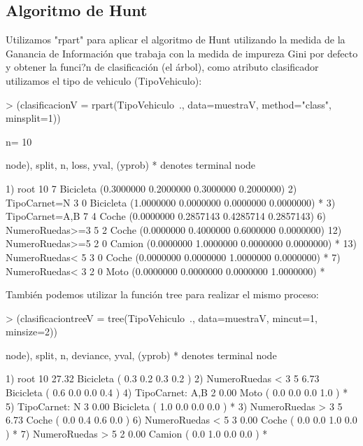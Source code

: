 \documentclass[a4paper]{article}
\begin{document}
\subsection{Algoritmo de Hunt}
Utilizamos "rpart" para aplicar el algoritmo de Hunt utilizando la medida de la Ganancia de Información que trabaja con la medida
de impureza Gini por defecto y obtener la funci?n de clasificación (el árbol), como atributo clasificador utilizamos el tipo de vehiculo (TipoVehiculo):
\begin{Schunk}
\begin{Sinput}
> (clasificacionV = rpart(TipoVehiculo~., data=muestraV, method="class", minsplit=1))
\end{Sinput}
\begin{Soutput}
n= 10 

node), split, n, loss, yval, (yprob)
      * denotes terminal node

 1) root 10 7 Bicicleta (0.3000000 0.2000000 0.3000000 0.2000000)  
   2) TipoCarnet=N 3 0 Bicicleta (1.0000000 0.0000000 0.0000000 0.0000000) *
   3) TipoCarnet=A,B 7 4 Coche (0.0000000 0.2857143 0.4285714 0.2857143)  
     6) NumeroRuedas>=3 5 2 Coche (0.0000000 0.4000000 0.6000000 0.0000000)  
      12) NumeroRuedas>=5 2 0 Camion (0.0000000 1.0000000 0.0000000 0.0000000) *
      13) NumeroRuedas< 5 3 0 Coche (0.0000000 0.0000000 1.0000000 0.0000000) *
     7) NumeroRuedas< 3 2 0 Moto (0.0000000 0.0000000 0.0000000 1.0000000) *
\end{Soutput}
\end{Schunk}

También podemos utilizar la función tree para realizar el mismo proceso:
\begin{Schunk}
\begin{Sinput}
> (clasificaciontreeV = tree(TipoVehiculo~., data=muestraV, mincut=1, minsize=2))
\end{Sinput}
\begin{Soutput}
node), split, n, deviance, yval, (yprob)
      * denotes terminal node

1) root 10 27.32 Bicicleta ( 0.3 0.2 0.3 0.2 )  
  2) NumeroRuedas < 3 5  6.73 Bicicleta ( 0.6 0.0 0.0 0.4 )  
    4) TipoCarnet: A,B 2  0.00 Moto ( 0.0 0.0 0.0 1.0 ) *
    5) TipoCarnet: N 3  0.00 Bicicleta ( 1.0 0.0 0.0 0.0 ) *
  3) NumeroRuedas > 3 5  6.73 Coche ( 0.0 0.4 0.6 0.0 )  
    6) NumeroRuedas < 5 3  0.00 Coche ( 0.0 0.0 1.0 0.0 ) *
    7) NumeroRuedas > 5 2  0.00 Camion ( 0.0 1.0 0.0 0.0 ) *
\end{Soutput}
\end{Schunk}
\end{document}
